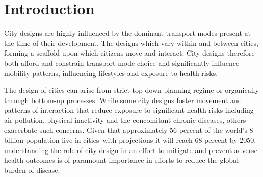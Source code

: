 \documentclass[preprint,12pt]{elsarticle}
\begin{document}
\begin{frontmatter}









\end{frontmatter}



\section*{Introduction}

City designs are highly influenced by the dominant transport modes present at the time of their development\cite{KNOWLES2020102607}. The designs which vary within and between cities, forming a scaffold upon which citizens move and interact\cite{Thompson2020}. City designs therefore both afford and constrain transport mode choice and significantly influence mobility patterns, influencing lifestyles and exposure to health risks\cite{WHO2023}.

The design of cities can arise from strict top-down planning regime\cite{mundigo1977city} or organically through bottom-up processes\cite{batty2017thinking}. While some city designs foster movement and patterns of interaction that reduce exposure to significant health risks including air pollution, physical inactivity and the concomitant chronic diseases, others exacerbate such concerns\cite{Wijnands2022, Stevenson2016,wang2023flood, stanley2022managing}. Given that approximately 56 percent of the world's 8 billion population live in cities--with projections it will reach 68 percent by 2050\cite{WHO2023}, understanding the role of city design in an effort to mitigate and prevent adverse health outcomes is of paramount importance in efforts to reduce the global burden of disease. 
\end{document}
